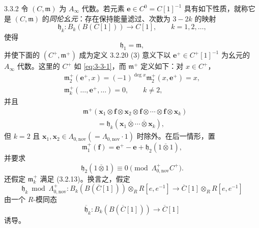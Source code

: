 \begin{definition}{3.3.2}\label{def:3-3-2}
令 $(C,\mathfrak m)$ 为 $A_\infty$ 代数。若元素
$\mathbf e\in C^0=C[1]^{-1}$ 具有如下性质，就称它是
$(C,\mathfrak m)$ 的\emph{同伦幺元}：存在保持能量滤过、次数为 $3-2k$ 的映射
\[
  \mathfrak h_k\colon B_k(B(C[1]))\longrightarrow C[1],
  \qquad k=1,2,\ldots,
\]
使得
\begin{equation}
  \mathfrak h_1=\mathfrak m,
  \tag{3.3.3}\label{eq:3-3-3}
\end{equation}
并使下面的 $(C^+,\mathfrak m^+)$ 成为定义 3.2.20 (3) 意义下以
$\mathbf e^+\in C^+[1]^{-1}$ 为幺元的 $A_\infty$ 代数。这里的 $C^+$ 如
\eqref{eq:3-3-1}，而 $\mathfrak m^+$ 定义如下：对 $x\in C^+$，
\begin{equation}
\begin{gathered}
  \mathfrak m_2^+(\mathbf e^+,x)
  =(-1)^{\deg x}\mathfrak m_2^+(x,\mathbf e^+)=x,\\
  \mathfrak m_k^+(\ldots,\mathbf e^+,\ldots)=0,
  \qquad k\ne2,
\end{gathered}
\tag{3.3.4}\label{eq:3-3-4}
\end{equation}
并且
\begin{equation}
\begin{aligned}
  &\mathfrak m^+
  (\mathbf x_1\otimes\mathbf f\otimes\mathbf x_2
  \otimes\mathbf f\otimes\cdots\otimes\mathbf f\otimes\mathbf x_k)\\
  &\qquad={}
  \mathfrak h_k(\mathbf x_1\mathbin{\overline\otimes}\cdots
  \mathbin{\overline\otimes}\mathbf x_k),
\end{aligned}
\tag{3.3.5.1}\label{eq:3-3-5-1}
\end{equation}
但 $k=2$ 且
$\mathbf x_1,\mathbf x_2\in\Lambda_{0,\mathrm{nov}}
(=\Lambda_{0,\mathrm{nov}}\cdot1)$ 时除外。在后一情形，置
\begin{equation}
  \mathfrak m_1^+(\mathbf f)
  =\mathbf e^+-\mathbf e
  +\mathfrak h_2(1\mathbin{\overline\otimes}1),
  \tag{3.3.5.2}\label{eq:3-3-5-2}
\end{equation}
并要求
\begin{equation}
  \mathfrak h_2(1\mathbin{\overline\otimes}1)
  \equiv0\pmod{\Lambda^+_{0,\mathrm{nov}}C^+}.
  \tag{3.3.5.3}\label{eq:3-3-5-3}
\end{equation}
还假定 $\mathfrak m_k^+$ 满足 (3.2.13)。换言之，假定
\[
  \mathfrak h_k\bmod\Lambda^+_{0,\mathrm{nov}}\colon
  B_k(B(\overline C[1]))\otimes_RR[e,e^{-1}]
  \longrightarrow\overline C[1]\otimes_RR[e,e^{-1}]
\]
由一个 $R$-模同态
\begin{equation}
  \overline{\mathfrak h}_k\colon
  B_k(B(\overline C[1]))\longrightarrow\overline C[1]
  \tag{3.3.6}\label{eq:3-3-6}
\end{equation}
诱导。
\end{definition}

